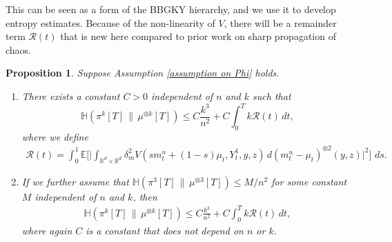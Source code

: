 \documentclass[11pt,reqno]{amsart}
\numberwithin{equation}{section}
\newtheorem{proposition}[theorem]{Proposition}
\theoremstyle{definition}
\def\E{{\mathbb E}}
\def\R{{\mathbb R}}
\newcommand{\ent}{ \mathbb H}
\begin{document}
This can be seen as a form of the BBGKY hierarchy, and we use it to develop entropy estimates. Because of the non-linearity of $V$, there will be a remainder term $\mathcal R(t)$ that is new here compared to prior work on sharp propagation of chaos.

\begin{proposition}
\label{pr: differential inequality short time}
Suppose Assumption \ref{assumption on Phi} holds.
\begin{enumerate}
    \item There exists a constant $C>0$ independent of $n$ and $k$ such that
    \begin{equation}
    \label{eq: differential inequality short suboptimal}
    \ent(\pi^k[T]\,\|\,\mu^{\otimes k}[T])\leq C\frac{k^3}{n^2}+C\int_0^T k  \mathcal R(t)\,dt,
\end{equation}
where we define
\begin{align}
    \mathcal R(t) = \int_0^1\E\bigg[\Big|\int_{\R^d\times \R^d} \delta_m^2  V(sm_t^n+(1-s)\mu_t,Y_t^1,y,z)\,d(m_t^n-\mu_t)^{\otimes2}(y,z)\Big|^2\bigg]\,\,ds. \label{def:remainder1}
\end{align}
\item If we further assume that $\ent(\pi^3[T]\,\|\,\mu^{\otimes 3}[T])\leq M/n^2$ for some constant $M$ independent of $n$ and $k$, then 
\begin{align}
\label{eq: differential inequality short optimal}
    \ent(\pi^k[T]\,\|\,\mu^{\otimes k}[T])\leq C\frac{k^2}{n^2}+C\int_0^Tk \mathcal R(t)\,dt,
\end{align}
where again $C$ is a constant that does not depend on $n$ or $k$.
\end{enumerate}
\end{proposition}
\end{document}
